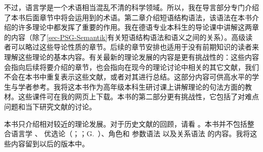 不过，语言学是一个术语相当混乱不清的科学领域。所以，我在导言部分专门介绍了本书后面章节中将会运用到的术语。第二章介绍短语结构语法，该语法在本书介绍的许多理论中都发挥了重要的作用。我在德语专业本科生的导论课中讲解这两章的内容（除了\ref{sec-PSG-Semantik}有关短语结构语法和语义之间的关系）。高级读者可以略过这些导论性质的章节。后续的章节安排也适用于没有前期知识的读者来理解这些理论的基本内容。有关最新的理论发展的内容是更有挑战性的：这些内容会指向后续将要介绍的章节，也会指向在现今的理论讨论中相关的其它文献，我们不会在本书中重复表示这些文献，或者对其进行总结。这部分内容可供高水平的学生与学者参考。我将这本书作为高年级本科生研讨课上讲解理论的句法方面的教材。这些课件可在我的网页上下载。本书的第二部分更有挑战性，它包括了对难点问题和当下研究文献的讨论。

本书只介绍相对较近的理论发展。对于历史文献的回顾，请看 。本书并不包括整
合语言学 \citep{Lieb83a-u,Eisenberg2004a,Nolda2007a-u}、
优选论\indexotc（\citealp{PS93a-u}；\citealp{Grimshaw97a-u}；G.\ \citealp{GMueller2000a-u}）、角色和
参数语法 \citep{vanValin93a-ed}以及关系语法
 \citep{Perlmutter83a-ed,Perlmutter84b-ed}的内容。我将这些内容留到以后的版本中。

